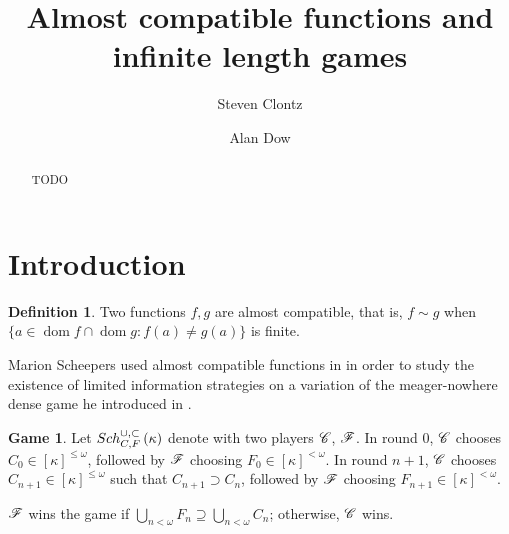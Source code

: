\documentclass{amsart}
\theoremstyle{plain}
\theoremstyle{definition}
\newtheorem{definition}[theorem]{Definition}
\newtheorem{game}[theorem]{Game}
\theoremstyle{remark}
\theoremstyle{plain}
\theoremstyle{definition}
\theoremstyle{remark}
\def\dom{\mathop{dom}}
\begin{document}
\title{Almost compatible functions and infinite length games}




\author{Steven Clontz}
\address{Department of Mathematics and Statistics, UNC Charlotte,
Charlotte, NC 28262}
\author{Alan Dow}
\address{Department of Mathematics and Statistics, UNC Charlotte,
Charlotte, NC 28262}


\subjclass[2010]{}


\begin{abstract}
  TODO
\end{abstract}


\maketitle

\section{Introduction}

  \begin{definition}
    Two functions \(f,g\) are almost compatible, that is, \(f\sim g\) when
    \(\{a\in\dom f\cap\dom g:f(a)\not=g(a)\}\) is finite.
  \end{definition}

  Marion Scheepers used almost compatible functions in \cite{MR1129143} in order
  to study the existence of limited information strategies on a variation
  of the meager-nowhere dense game he introduced in \cite{MR1183703}.

  \begin{game}
    Let \(Sch^{\cup,\subset}_{C,F}\left({\kappa}\right)\) denote
    with two players \(\mathscr{C}\), \(\mathscr{F}\). In round \(0\), \(\mathscr{C}\) chooses
    \(C_0\in[\kappa]^{\leq\omega}\), followed by \(\mathscr{F}\) choosing
    \(F_0\in[\kappa]^{<\omega}\). In round \(n+1\), \(\mathscr{C}\) chooses
    \(C_{n+1}\in[\kappa]^{\leq\omega}\) such that \(C_{n+1}\supset C_n\), followed
    by \(\mathscr{F}\) choosing \(F_{n+1}\in[\kappa]^{<\omega}\).

    \(\mathscr{F}\) wins the game if
    \(\bigcup_{n<\omega} F_n\supseteq\bigcup_{n<\omega} C_n\); otherwise,
    \(\mathscr{C}\) wins.
  \end{game}
\end{document}
